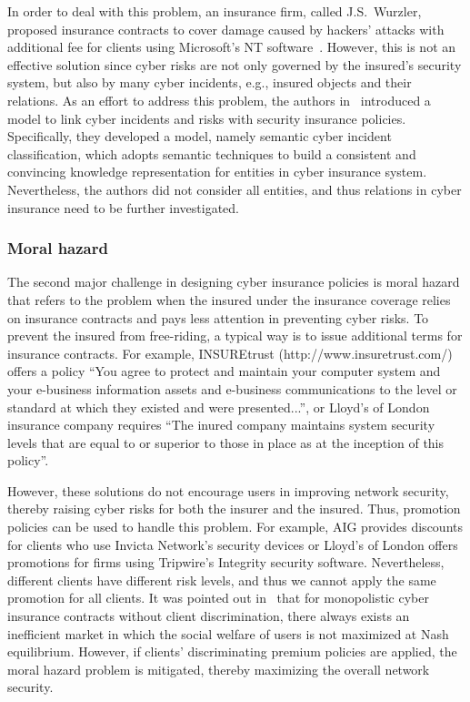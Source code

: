 \documentclass[twocolumn,10pt]{IEEEtran}
\begin{document}
In order to deal with this problem, an insurance firm, called J.S.~Wurzler, proposed insurance contracts to cover damage caused by hackers' attacks with additional fee for clients using Microsoft's NT software~\cite{Gordon2003AFrame}. However, this is not an effective solution since cyber risks are not only governed by the insured's security system, but also by many cyber incidents, e.g., insured objects and their relations. As an effort to address this problem, the authors in~\cite{Elnagdy2016Cyber} introduced a model to link cyber incidents and risks with security insurance policies. Specifically, they developed a model, namely semantic cyber incident classification, which adopts semantic techniques to build a consistent and convincing knowledge representation for entities in cyber insurance system. Nevertheless, the authors did not consider all entities, and thus relations in cyber insurance need to be further investigated.  



\subsubsection{Moral hazard}

The second major challenge in designing cyber insurance policies is moral hazard that refers to the problem when the insured under the insurance coverage relies on insurance contracts and pays less attention in preventing cyber risks. To prevent the insured from free-riding, a typical way is to issue additional terms for insurance contracts. For example, INSUREtrust (http://www.insuretrust.com/) offers a policy ``You agree to protect and maintain your computer system and your e-business information assets and e-business communications to the level or standard at which they existed and were presented...'', or Lloyd's of London insurance company requires ``The inured company maintains system security levels that are equal to or superior to those in place as at the inception of this policy''. 

However, these solutions do not encourage users in improving network security, thereby raising cyber risks for both the insurer and the insured. Thus, promotion policies can be used to handle this problem. For example, AIG provides discounts for clients who use Invicta Network's security devices or Lloyd's of London offers promotions for firms using Tripwire's Integrity security software. Nevertheless, different clients have different risk levels, and thus we cannot apply the same promotion for all clients. It was pointed out in~\cite{Pal2014Will} that for monopolistic cyber insurance contracts without client discrimination, there always exists an inefficient market in which the social welfare of users is not maximized at Nash equilibrium. However, if clients' discriminating premium policies are applied, the moral hazard problem is mitigated, thereby maximizing the overall network security.
\end{document}

